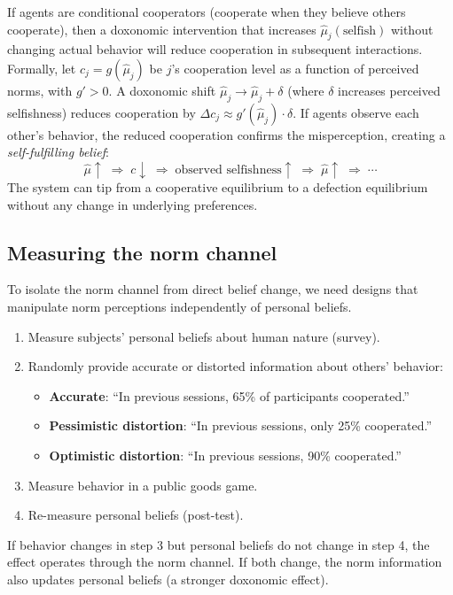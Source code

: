 \begin{proposition}
\label{prop:norm-misperception}
If agents are conditional cooperators (cooperate when they believe others cooperate), then a doxonomic intervention that increases $\hat{\mu}_j(\text{selfish})$ without changing actual behavior will reduce cooperation in subsequent interactions.
Formally, let $c_j = g(\hat{\mu}_j)$ be $j$'s cooperation level as a function of perceived norms, with $g' > 0$.
A doxonomic shift $\hat{\mu}_j \to \hat{\mu}_j + \delta$ (where $\delta$ increases perceived selfishness) reduces cooperation by $\Delta c_j \approx g'(\hat{\mu}_j) \cdot \delta$.
If agents observe each other's behavior, the reduced cooperation confirms the misperception, creating a \emph{self-fulfilling belief}:
\[
  \hat{\mu} \uparrow \;\Rightarrow\; c \downarrow \;\Rightarrow\; \text{observed selfishness} \uparrow \;\Rightarrow\; \hat{\mu} \uparrow \;\Rightarrow\; \cdots
\]
The system can tip from a cooperative equilibrium to a defection equilibrium without any change in underlying preferences.
\end{proposition}

\subsection{Measuring the norm channel}

To isolate the norm channel from direct belief change, we need designs that manipulate norm perceptions independently of personal beliefs.

\begin{model}
\label{mod:norm-info}
\begin{enumerate}[nosep]
  \item Measure subjects' personal beliefs about human nature (survey).
  \item Randomly provide accurate or distorted information about others' behavior:
  \begin{itemize}[nosep]
    \item \textbf{Accurate}: ``In previous sessions, 65\% of participants cooperated.''
    \item \textbf{Pessimistic distortion}: ``In previous sessions, only 25\% cooperated.''
    \item \textbf{Optimistic distortion}: ``In previous sessions, 90\% cooperated.''
  \end{itemize}
  \item Measure behavior in a public goods game.
  \item Re-measure personal beliefs (post-test).
\end{enumerate}
If behavior changes in step 3 but personal beliefs do not change in step 4, the effect operates through the norm channel.
If both change, the norm information also updates personal beliefs (a stronger doxonomic effect).
\end{model}

